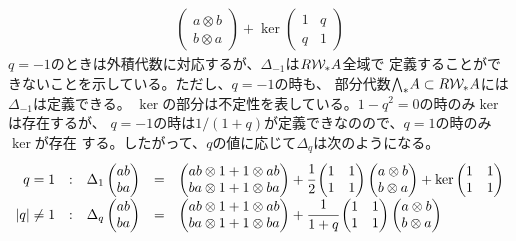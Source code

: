 {\begin{todo}[余積の性質]
\begin{equation*}
\begin{split}
\begin{pmatrix}
				a\otimes b \\ b\otimes a
			\end{pmatrix} + \ker \begin{pmatrix}
				1 & q \\ q & 1
			\end{pmatrix}
		\end{split}\end{equation*}
		$q=-1$のときは外積代数に対応するが、$\Delta_{-1}$は$R{{\mathcal{W}}}_*A$全域で
		定義することができないことを示している。ただし、$q=-1$の時も、
		部分代数${\bigwedge}_*A\subset R{{\mathcal{W}}}_*A$には$\Delta_{-1}$は定義できる。
		$\ker$の部分は不定性を表している。$1-q^2=0$の時のみ$\ker$は存在するが、
		$q=-1$の時は$1/(1+q)$が定義できなのので、$q=1$の時のみ$\ker$が存在
		する。したがって、$q$の値に応じて$\Delta_q$は次のようになる。
		\begin{equation*}\begin{array}{rcrcll}
			q = 1 &:& \Delta_{1} \begin{pmatrix}
				ab \\ ba
			\end{pmatrix} &=& \begin{pmatrix}
				ab\otimes 1 + 1\otimes ab \\ ba\otimes 1 + 1\otimes ba
			\end{pmatrix} + \cfrac{1}{2}\begin{pmatrix}
				1 & 1 \\ 1 & 1
			\end{pmatrix}\begin{pmatrix}
				a\otimes b \\ b\otimes a
			\end{pmatrix} + \ker \begin{pmatrix}
				1 & 1 \\ 1 & 1
			\end{pmatrix} \\
			|q| \neq 1 &:& \Delta_q \begin{pmatrix}
				ab \\ ba
			\end{pmatrix} &=& \begin{pmatrix}
				ab\otimes 1 + 1\otimes ab \\ ba\otimes 1 + 1\otimes ba
			\end{pmatrix} + \cfrac{1}{1+q}\begin{pmatrix}
				1 & 1 \\ 1 & 1
			\end{pmatrix}\begin{pmatrix}
				a\otimes b \\ b\otimes a
			\end{pmatrix}
		\end{array}\end{equation*}


\end{todo}}
